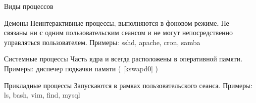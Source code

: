 \begin{frame}{Виды процессов}
  \begin{block}{Демоны}
    Неинтерактивные процессы, выполняются в фоновом режиме. Не связаны ни с одним пользовательским сеансом и не могут непосредственно управляться пользователем. \newline
    Примеры: \alert{sshd}, \alert{apache}, \alert{cron}, \alert{samba}
  \end{block} \pause

  \begin{block}{Системные процессы}
    Часть ядра и всегда расположены в оперативной памяти.  Примеры: диспечер подкачки памяти ( \alert{[kswapd0]} )
  \end{block} \pause

  \begin{block}{Прикладные процессы}
    Запускаются в рамках пользовательского сеанса. \newline
    Примеры: \alert{ls}, \alert{bash}, \alert{vim}, \alert{find}, \alert{mysql}

  \end{block}

\end{frame}
